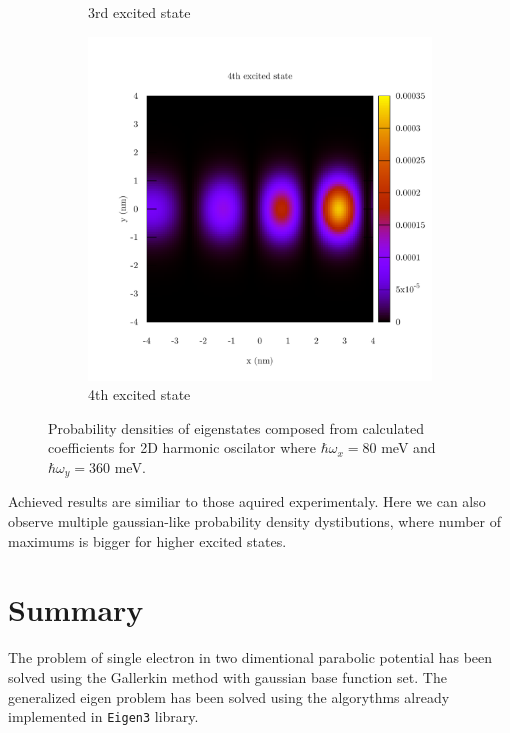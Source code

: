\documentclass[12pt,a4]{article}
\begin{document}
\begin{figure}[H]
\begin{subfigure}{.33\textwidth}
		\caption{3rd excited state}
	\end{subfigure}
	\begin{subfigure}{.33\textwidth}
		\includegraphics[width=\textwidth]{../plots/y_state_4.pdf}
		\caption{4th excited state}
	\end{subfigure}
	\caption{Probability densities of eigenstates composed from calculated coefficients for 2D harmonic oscilator where $ \hbar\omega_x=80 $ meV and $ \hbar\omega_y =360$ meV.}
\end{figure}

Achieved results are similiar to those aquired experimentaly. Here we can also observe multiple gaussian-like probability density dystibutions, where number of maximums is bigger for higher excited states.


\section*{Summary}

The problem of single electron in two dimentional parabolic potential has been solved using the Gallerkin method with gaussian base function set. The generalized eigen problem has been solved using the algorythms already implemented in \texttt{Eigen3} library. 
\end{document}
